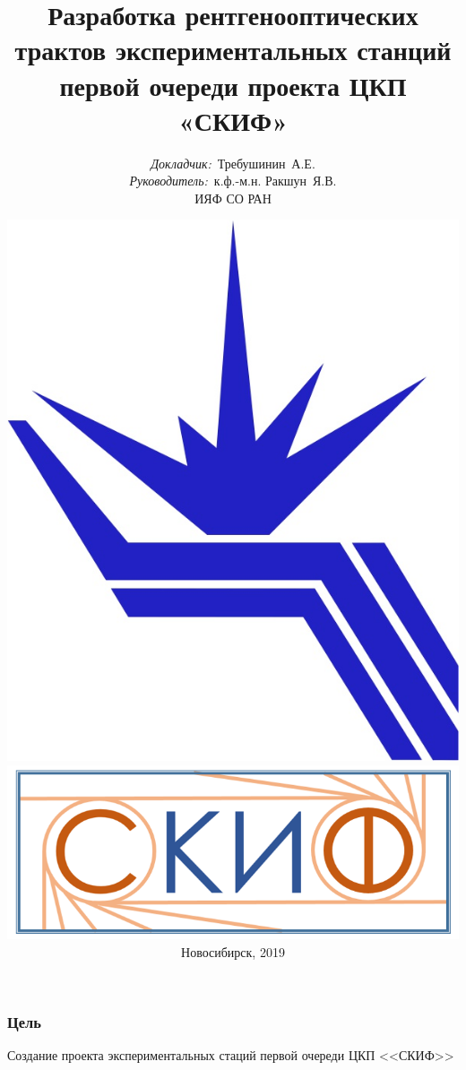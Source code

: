 \documentclass[14pt, hyperref = {colorlinks}]{beamer}
\title{\small{Разработка рентгенооптических трактов экспериментальных станций первой очереди проекта ЦКП «СКИФ»}}
\author{\small{%
		\emph{Докладчик:}~Требушинин~А.Е.\\%
		\emph{Руководитель:}~к.ф.-м.н. Ракшун~Я.В.}\\%
	\vspace{30pt}%
  	ИЯФ СО РАН
	\vspace{-15pt}%
}
\date{\includegraphics[width=0.1\linewidth]{pic/logo.jpg} \hspace{20pt}
	\includegraphics[width=0.2\linewidth]{pic/SKIFlogo.png}\\
	
	\vspace{5pt}%
	\small{Новосибирск, 2019}}
\begin{document}
\maketitle

\small
\begin{frame}
\frametitle{Цель}\label{t1}
\begin{center}
	\large{Создание проекта экспериментальных стаций первой очереди ЦКП <<СКИФ>>}
\end{center}
\end{frame}

\end{document}
